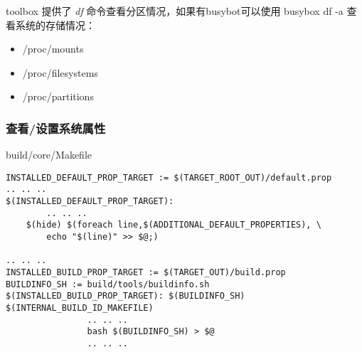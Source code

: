\documentclass[a4paper,titlepage]{article}
\makeatletter
\newcommand{\tabcaption}{\def\@captype{table}\caption}
\makeatother
\begin{document}
toolbox 提供了 \emph{df} 命令查看分区情况，如果有busybot可以使用 busybox df -a 查看系统的存储情况：
\tabcaption{proc 文件系统与分区相关的文件}
\begin{itemize}
    \item /proc/mounts 
    \item /proc/filesystems
    \item /proc/partitions
\end{itemize}
\subsubsection{查看/设置系统属性} 
build/core/Makefile
\begin{lstlisting}
INSTALLED_DEFAULT_PROP_TARGET := $(TARGET_ROOT_OUT)/default.prop
.. .. ..
$(INSTALLED_DEFAULT_PROP_TARGET):
        .. .. ..
	$(hide) $(foreach line,$(ADDITIONAL_DEFAULT_PROPERTIES), \
		echo "$(line)" >> $@;)

.. .. ..
INSTALLED_BUILD_PROP_TARGET := $(TARGET_OUT)/build.prop
BUILDINFO_SH := build/tools/buildinfo.sh 
$(INSTALLED_BUILD_PROP_TARGET): $(BUILDINFO_SH) $(INTERNAL_BUILD_ID_MAKEFILE) 
                .. .. ..
                bash $(BUILDINFO_SH) > $@
                .. .. ..
\end{lstlisting}
\end{document}
